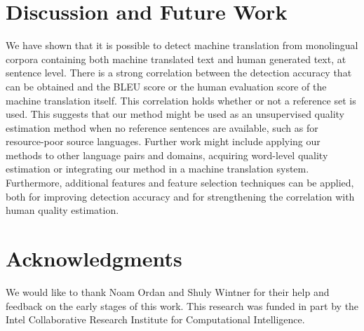 \documentclass[11pt]{article}
\begin{document}
\section{Discussion and Future Work}

We have shown that it is possible to detect machine translation from monolingual corpora containing both machine translated text and human generated text, at sentence level. There is a strong correlation between the detection accuracy that can be obtained and the BLEU score or the human evaluation score of the machine translation itself. This correlation holds whether or not a reference set is used. This suggests that our method might be used as an unsupervised quality estimation method when no reference sentences are available, such as for resource-poor source languages. %
Further work might include applying our methods to other language pairs and domains, acquiring word-level quality estimation or integrating our method in a machine translation system. Furthermore, additional features and feature selection techniques can be applied, both for improving detection accuracy and for strengthening the correlation with human quality estimation.

\section*{Acknowledgments}

We would like to thank Noam Ordan and Shuly Wintner for their help and feedback on the early stages of this work. This research was funded in part by the Intel Collaborative Research Institute for Computational Intelligence.

\vspace{10 mm}


\end{document}
